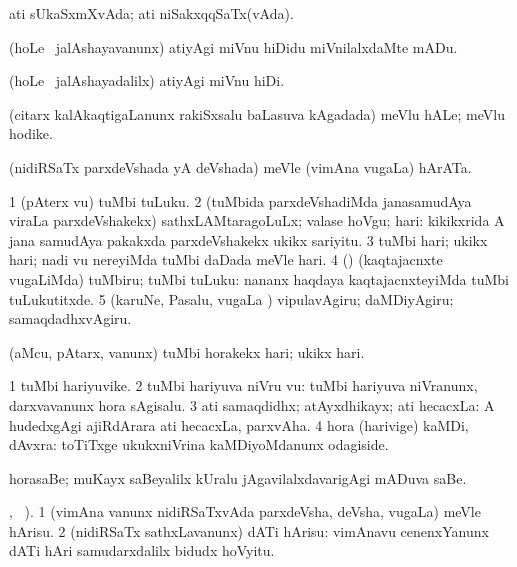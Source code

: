 \bentry
{}
\gl{\gu}
\bmng
ati sUkaSxmXvAda; ati niSakxqqSaTx(vAda). 
\emng
\eentry

\bentry
{}
\gl{\sakirx}
\bmng
(hoLe \mo\ jalAshayavanunx) atiyAgi miVnu hiDidu miVnilalxdaMte mADu. 
\emng

\noindent
\gl{\akirx}
\bmng
(hoLe \mo\ jalAshayadalilx) atiyAgi miVnu hiDi. 
\emng
\eentry

\bentry
{}
\gl{\nA}
\bmng
(citarx kalAkaqtigaLanunx rakiSxsalu baLasuva kAgadada) meVlu hALe; meVlu hodike. 
\emng
\eentry

\bentry
{}
\gl{\nA}
\bmng
(nidiRSaTx parxdeVshada yA deVshada) meVle (vimAna \mo vugaLa) hArATa. 
\emng
\eentry

\bentry
{}
\gl{\akirx}
\bmng
\bnum
\num{1} (pAterx \mo vu) tuMbi tuLuku. 
\num{2} (tuMbida parxdeVshadiMda janasamudAya viraLa parxdeVshakekx) sathxLAMtaragoLuLx; valase hoVgu; hari:  kikikxrida A jana samudAya pakakxda parxdeVshakekx ukikx sariyitu. 
\num{3} tuMbi hari; ukikx hari; nadi \mo vu nereyiMda tuMbi daDada meVle hari. 
\num{4} (\rUpa) (kaqtajacnxte \mo vugaLiMda) tuMbiru; tuMbi tuLuku:  nananx haqdaya kaqtajacnxteyiMda tuMbi tuLukutitxde. 
\num{5} (karuNe, Pasalu, \mo vugaLa \vi) vipulavAgiru; daMDiyAgiru; samaqdadhxvAgiru. 
\enum
\emng

\noindent
\gl{\sakirx}
\bmng
(aMcu, pAtarx, \mo vanunx) tuMbi horakekx hari; ukikx hari. 
\emng
\eentry

\bentry
{}
\gl{\nA}
\bmng
\bnum
\num{1} tuMbi hariyuvike. 
\num{2} tuMbi hariyuva niVru \mo vu:  tuMbi hariyuva niVranunx, darxvavanunx hora sAgisalu. 
\num{3} ati samaqdidhx; atAyxdhikayx; ati hecacxLa:  A hudedxgAgi ajiRdArara ati hecacxLa, parxvAha. 
\num{4} hora (harivige) kaMDi, dAvxra:  toTiTxge ukukxniVrina kaMDiyoMdanunx odagiside. 
\enum
\emng

\noindent
\gl{\pagu}
\bmng
{} horasaBe; muKayx saBeyalilx kUralu jAgavilalxdavarigAgi mADuva saBe. 
\emng
\eentry

\bentry
{}
\gl{\sakirx}
, \BUkaq\ ).\bmng
\bnum
\num{1} (vimAna \mo vanunx nidiRSaTxvAda parxdeVsha, deVsha, \mo vugaLa) meVle hArisu. 
\num{2} (nidiRSaTx sathxLavanunx) dATi hArisu:  vimAnavu cenenxYanunx dATi hAri samudarxdalilx bidudx hoVyitu. 
\enum
\emng
\eentry

